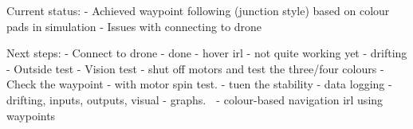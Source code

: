 Current status:
 - Achieved waypoint following (junction style) based on colour pads in simulation
 - Issues with connecting to drone 
 
Next steps:
 - Connect to drone - done
 - hover irl - not quite working yet - drifting 
 - Outside test 
 - Vision test - shut off motors and test the three/four colours 
 - Check the waypoint - with motor spin test. 
 - tuen the stability 
 - data logging - drifting, inputs, outputs, visual - graphs. 
 - colour-based navigation irl using waypoints 
